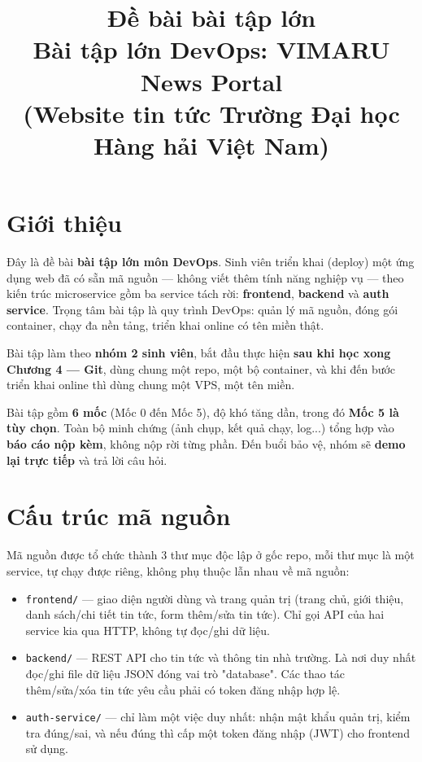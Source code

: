 \documentclass[a4paper,11pt]{article}
\title{\textbf{Đề bài bài tập lớn}\\[4pt]
\large Bài tập lớn DevOps: VIMARU News Portal\\[2pt]
\normalsize (Website tin tức Trường Đại học Hàng hải Việt Nam)}
\author{}
\date{}
\begin{document}
\maketitle
\thispagestyle{fancy}

\section*{Giới thiệu}

Đây là đề bài \textbf{bài tập lớn môn DevOps}. Sinh viên triển khai (deploy) một ứng dụng web đã có sẵn mã nguồn — không viết thêm tính năng nghiệp vụ — theo kiến trúc microservice gồm ba service tách rời: \textbf{frontend}, \textbf{backend} và \textbf{auth service}. Trọng tâm bài tập là quy trình DevOps: quản lý mã nguồn, đóng gói container, chạy đa nền tảng, triển khai online có tên miền thật.

Bài tập làm theo \textbf{nhóm 2 sinh viên}, bắt đầu thực hiện \textbf{sau khi học xong Chương 4 — Git}, dùng chung một repo, một bộ container, và khi đến bước triển khai online thì dùng chung một VPS, một tên miền.

Bài tập gồm \textbf{6 mốc} (Mốc 0 đến Mốc 5), độ khó tăng dần, trong đó \textbf{Mốc 5 là tùy chọn}. Toàn bộ minh chứng (ảnh chụp, kết quả chạy, log...) tổng hợp vào \textbf{báo cáo nộp kèm}, không nộp rời từng phần. Đến buổi bảo vệ, nhóm sẽ \textbf{demo lại trực tiếp} và trả lời câu hỏi.

\section*{Cấu trúc mã nguồn}

Mã nguồn được tổ chức thành 3 thư mục độc lập ở gốc repo, mỗi thư mục là một service, tự chạy được riêng, không phụ thuộc lẫn nhau về mã nguồn:

\begin{itemize}[itemsep=3pt]
  \item \texttt{frontend/} — giao diện người dùng và trang quản trị (trang chủ, giới thiệu, danh sách/chi tiết tin tức, form thêm/sửa tin tức). Chỉ gọi API của hai service kia qua HTTP, không tự đọc/ghi dữ liệu.
  \item \texttt{backend/} — REST API cho tin tức và thông tin nhà trường. Là nơi duy nhất đọc/ghi file dữ liệu JSON đóng vai trò "database". Các thao tác thêm/sửa/xóa tin tức yêu cầu phải có token đăng nhập hợp lệ.
  \item \texttt{auth-service/} — chỉ làm một việc duy nhất: nhận mật khẩu quản trị, kiểm tra đúng/sai, và nếu đúng thì cấp một token đăng nhập (JWT) cho frontend sử dụng.
\end{itemize}
\end{document}
